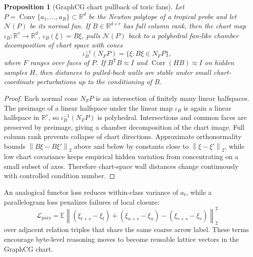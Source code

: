 \documentclass[11pt]{article}
\theoremstyle{definition}
\theoremstyle{plain}
\newtheorem{proposition}[definition]{Proposition}
\theoremstyle{remark}
\numberwithin{equation}{section}
\newcommand{\R}{\mathbb{R}}
\newcommand{\Eop}{\mathbb{E}}
\newcommand{\norm}[1]{\left\lVert #1\right\rVert}
\newcommand{\transpose}{^{\mathsf T}}
\begin{document}
\begin{proposition}[GraphCG chart pullback of toric fans]
Let $P=\operatorname{Conv}\{a_1,\ldots,a_R\}\subset\R^d$ be the Newton polytope of a tropical probe and let $\mathcal N(P)$ be its normal fan.  If $B\in\R^{d\times r}$ has full column rank, then the chart map $\iota_B:\R^r\to\R^d$, $\iota_B(\xi)=B\xi$, pulls $\mathcal N(P)$ back to a polyhedral fan-like chamber decomposition of chart space with cones
\begin{equation}
  \iota_B^{-1}(N_F P)=\{\xi:B\xi\in N_F P\},
\end{equation}
where $F$ ranges over faces of $P$.  If $B\transpose B\approx I$ and $\operatorname{Corr}(HB)\approx I$ on hidden samples $H$, then distances to pulled-back walls are stable under small chart-coordinate perturbations up to the conditioning of $B$.
\end{proposition}

\begin{proof}
Each normal cone $N_F P$ is an intersection of finitely many linear halfspaces.  The preimage of a linear halfspace under the linear map $\iota_B$ is again a linear halfspace in $\R^r$, so $\iota_B^{-1}(N_F P)$ is polyhedral.  Intersections and common faces are preserved by preimage, giving a chamber decomposition of the chart image.  Full column rank prevents collapse of chart directions.  Approximate orthonormality bounds $\norm{B\xi-B\xi'}_2$ above and below by constants close to $\norm{\xi-\xi'}_2$, while low chart covariance keeps empirical hidden variation from concentrating on a small subset of axes.  Therefore chart-space wall distances change continuously with controlled condition number.
\end{proof}

An analogical functor loss reduces within-class variance of $a_t$, while a parallelogram loss penalizes failures of local closure:
\begin{equation}
  \mathcal L_{\mathrm{para}}
  =\Eop\norm{(\xi_{t+s}-\xi_t)+(\xi_{u+s}-\xi_u)-(\xi_{v+s}-\xi_v)}_2^2
\end{equation}
over adjacent relation triples that share the same coarse arrow label.  These terms encourage byte-level reasoning moves to become reusable lattice vectors in the GraphCG chart.
\end{document}
